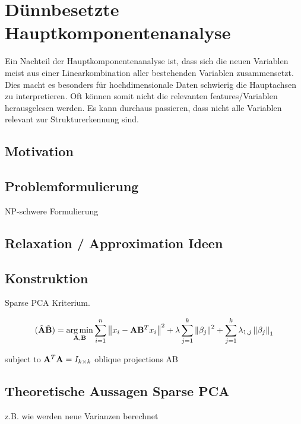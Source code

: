 \chapter{Dünnbesetzte Hauptkomponentenanalyse}

\label{sparse_pca}

Ein Nachteil der Hauptkomponentenanalyse ist, dass sich die neuen Variablen meist aus einer Linearkombination aller bestehenden Variablen zusammensetzt. Dies macht es besonders für hochdimensionale Daten schwierig die Hauptachsen zu interpretieren. Oft können somit nicht die relevanten features/Variablen herausgelesen werden. Es kann durchaus passieren, dass nicht alle Variablen relevant zur Strukturerkennung sind. 

\section{Motivation}

\section{Problemformulierung}
NP-schwere Formulierung

\section{Relaxation / Approximation Ideen}

\section{Konstruktion}

Sparse PCA Kriterium.

$$(\hat{\mathbf{A}}\hat{\mathbf{B}}) = \operatorname*{arg\,min}_{\mathbf{A}, \mathbf{B}} \sum_{i=1}^{n} \left\lVert x_i - \mathbf{A}\mathbf{B}^Tx_i \right\rVert^2 + \lambda \sum_{j=1}^{k}\left\lVert \beta_j \right\rVert^2 + \sum_{j=1}^k \lambda_{1,j} \left\lVert \beta_j \right\rVert_1$$

subject to $\mathbf{A}^T\mathbf{A} = I_{k \times k}$
oblique projections AB

\section{Theoretische Aussagen Sparse PCA}
z.B. wie werden neue Varianzen berechnet